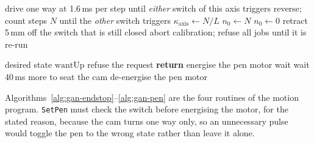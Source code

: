 \begin{algorithm}[!htbp]
\caption{Direction-agnostic calibration of one axis}
\label{alg:gan-calibrate}
\begin{algorithmic}[1]
\STATE drive one way at 1.6\,ms per step until \emph{either} switch of this axis triggers
\STATE reverse; count steps $N$ until the \emph{other} switch triggers
\STATE $\kappa_{\mathrm{axis}}\leftarrow N/L$ 
    \STATE $n_0\leftarrow N$
\ELSE
    \STATE $n_0\leftarrow0$
\ENDIF
\STATE retract 5\,mm off the switch that is still closed
    \STATE abort calibration; refuse all jobs until it is re-run
\ENDIF
\end{algorithmic}
\end{algorithm}

\begin{algorithm}[!htbp]
\caption{Pen toggle}
\label{alg:gan-pen}
\begin{algorithmic}[1]
\REQUIRE desired state $\mathrm{wantUp}$
    \STATE refuse the request
    \STATE \textbf{return} 
\ELSE
    \STATE energise the pen motor
        \STATE wait
    \ENDWHILE
        \STATE wait 40\,ms more to seat the cam
    \ENDIF
    \STATE de-energise the pen motor
\ENDIF
\end{algorithmic}
\end{algorithm}

Algorithms~\ref{alg:gan-endstop}--\ref{alg:gan-pen} are the four routines of the motion program. \texttt{SetPen} must check the switch before energising the motor, for the stated reason, because the cam turns one way only, so an unnecessary pulse would toggle the pen to the wrong state rather than leave it alone.
